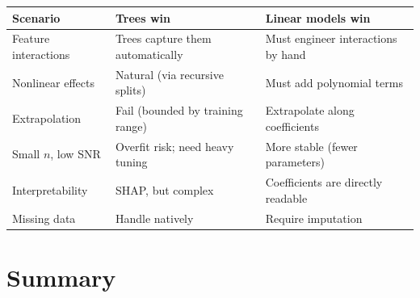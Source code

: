 \begin{center}
\begin{tabular}{p{4cm} p{5cm} p{5cm}}
\toprule
\textbf{Scenario} & \textbf{Trees win} & \textbf{Linear models win} \\
\midrule
Feature interactions & Trees capture them automatically & Must engineer interactions by hand \\[4pt]
Nonlinear effects & Natural (via recursive splits) & Must add polynomial terms \\[4pt]
Extrapolation & Fail (bounded by training range) & Extrapolate along coefficients \\[4pt]
Small $n$, low SNR & Overfit risk; need heavy tuning & More stable (fewer parameters) \\[4pt]
Interpretability & SHAP, but complex & Coefficients are directly readable \\[4pt]
Missing data & Handle natively & Require imputation \\
\bottomrule
\end{tabular}
\end{center}

\section{Summary}
\label{sec:trees-summary}

